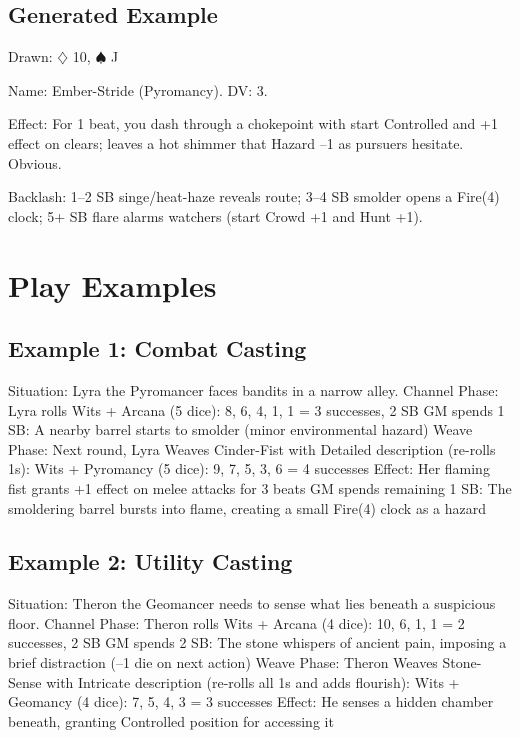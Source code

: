 \subsection{Generated Example}
Drawn: $\diamondsuit$ 10, $\spadesuit$ J

Name: Ember-Stride (Pyromancy). DV: 3.

Effect: For 1 beat, you dash through a chokepoint with start Controlled and +1 effect on clears; leaves a hot shimmer that Hazard --1 as pursuers hesitate. Obvious.

Backlash: 1--2 SB singe/heat-haze reveals route; 3--4 SB smolder opens a Fire(4) clock; 5+ SB flare alarms watchers (start Crowd +1 and Hunt +1).

\section{Play Examples}

\subsection{Example 1: Combat Casting}
Situation: Lyra the Pyromancer faces bandits in a narrow alley.
Channel Phase: Lyra rolls Wits + Arcana (5 dice): 8, 6, 4, 1, 1 = 3 successes, 2 SB
GM spends 1 SB: A nearby barrel starts to smolder (minor environmental hazard)
Weave Phase: Next round, Lyra Weaves Cinder-Fist with Detailed description (re-rolls 1s):
Wits + Pyromancy (5 dice): 9, 7, 5, 3, 6 = 4 successes
Effect: Her flaming fist grants +1 effect on melee attacks for 3 beats
GM spends remaining 1 SB: The smoldering barrel bursts into flame, creating a small Fire(4) clock as a hazard

\subsection{Example 2: Utility Casting}
Situation: Theron the Geomancer needs to sense what lies beneath a suspicious floor.
Channel Phase: Theron rolls Wits + Arcana (4 dice): 10, 6, 1, 1 = 2 successes, 2 SB
GM spends 2 SB: The stone whispers of ancient pain, imposing a brief distraction (–1 die on next action)
Weave Phase: Theron Weaves Stone-Sense with Intricate description (re-rolls all 1s and adds flourish): Wits + Geomancy (4 dice): 7, 5, 4, 3 = 3 successes
Effect: He senses a hidden chamber beneath, granting Controlled position for accessing it

